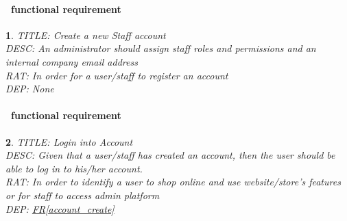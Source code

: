 \documentclass{scrreprt}
\theoremstyle{funreq}
\newtheorem{funreq}{}
\newcommand*{\reqref}[1]{\hyperref[#1]{FR\ref*{#1}}}
\begin{document}
\paragraph[]{\Subsectionname ~functional requirement }
\begin{funreq}
	\label{account_createstaff}
	TITLE: Create a new Staff account\\
	DESC: An administrator should assign staff roles and permissions and an internal company email address\\
	RAT: In order for a user/staff to register an account\\
	DEP: None\\
\end{funreq}

\paragraph[]{\Subsectionname ~functional requirement }
\begin{funreq}
	\label{account_login}
	TITLE: Login into Account\\
	DESC: Given that a user/staff has created an account, then the user should be able to log in to his/her account.\\
	RAT: In order to identify a user to shop online and use website/store’s features or for staff to access admin platform\\
	DEP: \reqref{account_create}
\end{funreq}
\end{document}
